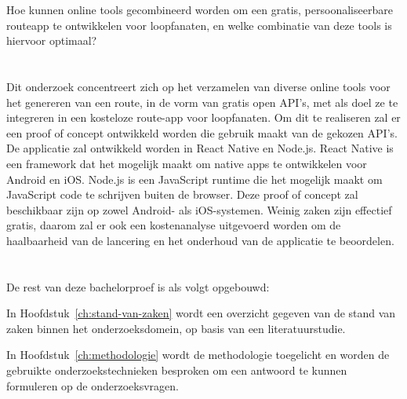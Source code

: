 Hoe kunnen online tools gecombineerd worden om een gratis, persoonaliseerbare routeapp te ontwikkelen voor loopfanaten, 
en welke combinatie van deze tools is hiervoor optimaal?

\section{}%
\label{sec:onderzoeksdoelstelling}

Dit onderzoek concentreert zich op het verzamelen van diverse online tools voor het genereren van een route, in de vorm van gratis open API's, 
met als doel ze te integreren in een kosteloze route-app voor loopfanaten.
Om dit te realiseren zal er een proof of concept ontwikkeld worden die gebruik maakt van de gekozen API's. 
De applicatie zal ontwikkeld worden in React Native en Node.js. React Native is een framework 
dat het mogelijk maakt om native apps te ontwikkelen voor Android en iOS\@. 
Node.js is een JavaScript runtime die het mogelijk maakt om JavaScript code te schrijven buiten de browser.
Deze proof of concept zal beschikbaar zijn op zowel Android- als iOS-systemen. Weinig zaken zijn effectief gratis, 
daarom zal er ook een kostenanalyse uitgevoerd worden om de haalbaarheid van de lancering en het onderhoud van de applicatie te beoordelen.

\section{}%
\label{sec:opzet-bachelorproef}


De rest van deze bachelorproef is als volgt opgebouwd:

In Hoofdstuk~\ref{ch:stand-van-zaken} wordt een overzicht gegeven van de stand van zaken binnen het onderzoeksdomein, op basis van een literatuurstudie.

In Hoofdstuk~\ref{ch:methodologie} wordt de methodologie toegelicht en worden de gebruikte onderzoekstechnieken besproken om een antwoord te kunnen formuleren op de onderzoeksvragen.

